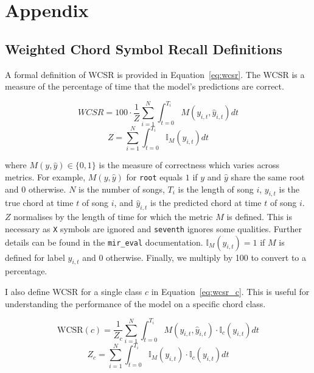 \appendix

\chapter{Appendix}

\section{Weighted Chord Symbol Recall Definitions}\label{app:weighted_chord_symbol_recall_definitions}

A formal definition of WCSR is provided in Equation~\ref{eq:wcsr}. The WCSR is a measure of the percentage of time that the model's predictions are correct.

\begin{equation}\label{eq:wcsr}
    WCSR = 100\cdot\frac{1}{Z}\sum_{i=1}^{N} \int_{t=0}^{T_i} M(y_{i,t},\hat{y}_{i,t}) dt
\end{equation}
\begin{equation}
    Z = \sum_{i=1}^{N} \int_{t=0}^{T_i} \mathbb{I}_M(y_{i,t}) dt
\end{equation}

where $M(y, \hat{y})\in\{0,1\}$ is the measure of correctness which varies across metrics. For example, $M(y, \hat{y})$ for \texttt{root} equals $1$ if $y$ and $\hat{y}$ share the same root and $0$ otherwise. $N$ is the number of songs, $T_i$ is the length of song $i$, $y_{i,t}$ is the true chord at time $t$ of song $i$, and $\hat{y}_{i,t}$ is the predicted chord at time $t$ of song $i$. $Z$ normalises by the length of time for which the metric $M$ is defined. This is necessary as \texttt{X} symbols are ignored and \texttt{seventh} ignores some qualities. Further details can be found in the \texttt{mir\_eval} documentation. $\mathbb{I}_M(y_{i,t})=1$ if $M$ is defined for label $y_{i,t}$ and $0$ otherwise. Finally, we multiply by 100 to convert to a percentage.

I also define WCSR for a single class $c$ in Equation~\ref{eq:wcsr_c}. This is useful for understanding the performance of the model on a specific chord class.

\begin{equation}\label{eq:wcsr_c}
    \text{WCSR}(c) = \frac{1}{Z_c}\sum_{i=1}^{N} \int_{t=0}^{T_i} M(y_{i,t},\hat{y}_{i,t}) \cdot \mathbb{I}_c(y_{i,t}) dt
\end{equation}
\begin{equation}
    Z_c = \sum_{i=1}^{N} \int_{t=0}^{T_i} \mathbb{I}_M(y_{i,t})\cdot \mathbb{I}_c(y_{i,t}) dt
\end{equation}

